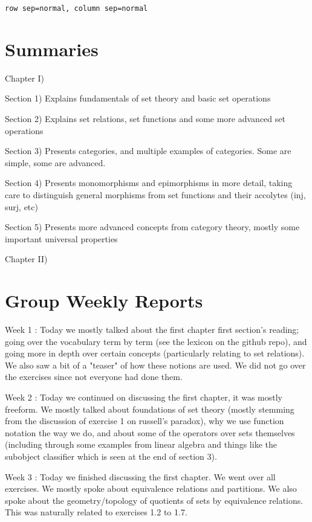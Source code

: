 \documentclass[12pt, letterpaper, twoside]{report}
\begin{document}
\texttt{row sep=normal, column sep=normal}

\author{Multiversity \textit{Algebra Chapter 0} Reading Group}
\part{Summaries}

Chapter I)

Section 1) Explains fundamentals of set theory and basic set operations

Section 2) Explains set relations, set functions and some more advanced set operations

Section 3) Presents categories, and multiple examples of categories. Some are simple, some are advanced.

Section 4) Presents monomorphisms and epimorphisms in more detail, taking care to distinguish general morphisms from set functions and their accolytes (inj, surj, etc)

Section 5) Presents more advanced concepts from category theory, mostly some important universal properties


Chapter II)



\newpage


\part{Group Weekly Reports}

Week 1 : Today we mostly talked about the first chapter first section's reading; going over the vocabulary term by term (see the lexicon on the github repo), and going more in depth over certain concepts (particularly relating to set relations). We also saw a bit of a "teaser" of how these notions are used. We did not go over the exercises since not everyone had done them.

Week 2 : Today we continued on discussing the first chapter, it was mostly freeform. We mostly talked about foundations of set theory (mostly stemming from the discussion of exercise 1 on russell's paradox), why we use function notation the way we do, and about some of the operators over sets themselves (including through some examples from linear algebra and things like the subobject classifier which is seen at the end of section 3). 

Week 3 : Today we finished discussing the first chapter. We went over all exercises. We mostly spoke about equivalence relations and partitions. We also spoke about the geometry/topology of quotients of sets by equivalence relations. This was naturally related to exercises 1.2 to 1.7.
\end{document}
